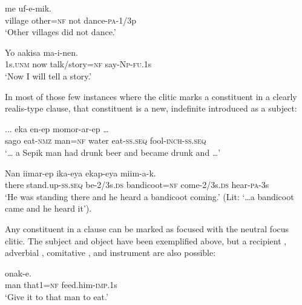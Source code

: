 \ea%
\label{ex:x1721}
\gll {}    me  uf-e-mik. \\
village  other=\textsc{nf}  not  dance-\textsc{pa}-1/3p      \\
\glt`Other villages did not dance.'
\z


\ea%
\label{ex:x1722}
\gll Yo  aakisa    ma-i-nen. \\
1s.\textsc{unm}  now  talk/story=\textsc{nf}  say-\textsc{Np}-\textsc{fu}.1s      \\
\glt`Now I will tell a story.'
\z


In most of those few instances where the  clitic marks a constituent in a clearly realis-type clause, that constituent is a new, indefinite  introduced as a subject:

\ea%
\label{ex:x1733}
\gll ...    eka  en-ep  momor-ar-ep  {\dots} \\
sago  eat-\textsc{nmz}  man=\textsc{nf}  water  eat-\textsc{ss}.\textsc{seq}  fool-\textsc{inch}-\textsc{ss}.\textsc{seq}\\
\glt`{\dots} a Sepik man had drunk beer and became drunk and {\dots}'
\z


\ea%
\label{ex:x1732}
\gll Nan  iimar-ep  ika-eya    ekap-eya miim-a-k.\\
there  stand.up-\textsc{ss}.\textsc{seq}  be-2/3s.\textsc{ds}  bandicoot=\textsc{nf}  come-2/3s.\textsc{ds} hear-\textsc{pa}-3s     \\
\glt`He was standing there and he heard a bandicoot coming.' (Lit: `{\dots}a bandicoot came and he heard it').
\z


Any constituent in a clause can be marked as focused with the neutral focus clitic. The subject and object have been exemplified above, but a recipient , adverbial , comitative ,  and instrument  are also possible:

\ea%
\label{ex:x1723}
\gll {}   onak-e. \\
man  that1=\textsc{nf}  feed.him-\textsc{imp}.1s      \\
\glt`Give it to that man to eat.'
\z


